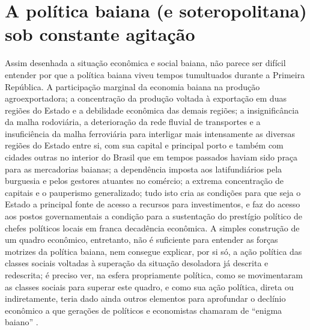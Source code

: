 \section{A política baiana (e soteropolitana) sob constante agitação}\label{sec:1.3}

Assim desenhada a situação econômica e social baiana, não parece ser difícil entender por que a política baiana viveu tempos tumultuados durante a Primeira República. A participação marginal da economia baiana na produção agroexportadora; a concentração da produção voltada à exportação em duas regiões do Estado e a debilidade econômica das demais regiões; a insignificância da malha rodoviária, a deterioração da rede fluvial de transportes e a insuficiência da malha ferroviária para interligar mais intensamente as diversas regiões do Estado entre si, com sua capital e principal porto e também com cidades outras no interior do Brasil que em tempos passados haviam sido praça para as mercadorias baianas; a dependência imposta aos latifundiários pela burguesia e pelos gestores atuantes no comércio; a extrema concentração de capitais e o pauperismo generalizado; tudo isto cria as condições para que seja o Estado a principal fonte de acesso a recursos para investimentos, e faz do acesso aos postos governamentais a condição para a sustentação do prestígio político de chefes políticos locais em franca decadência econômica. A simples construção de um quadro econômico, entretanto, não é suficiente para entender as forças motrizes da política baiana, nem consegue explicar, por si só, a ação política das classes sociais voltadas à superação da situação desoladora já descrita e redescrita; é preciso ver, na esfera propriamente política, como se movimentaram as classes sociais para superar este quadro, e como sua ação política, direta ou indiretamente, teria dado ainda outros elementos para aprofundar o declínio econômico a que gerações de políticos e economistas chamaram de ``enigma baiano'' \cite{aguiar_notas_1958}.

